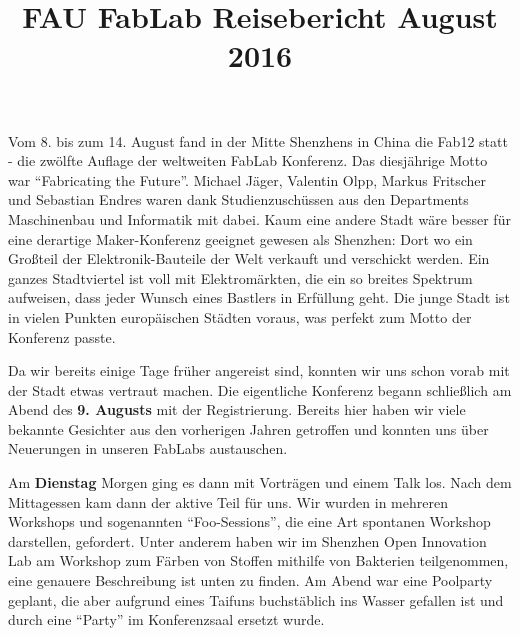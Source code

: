 \documentclass{\basedir/fablab-document}
\title{FAU FabLab Reisebericht August 2016}
\begin{document}
\begin{figure}[htb]
	\noindent{}
\end{figure}

\section*{}

Vom 8. bis zum 14. August fand in der Mitte Shenzhens in China die Fab12
statt - die zwölfte Auflage der weltweiten FabLab Konferenz. Das
diesjährige Motto war \enquote{Fabricating the Future}. Michael Jäger,
Valentin Olpp, Markus Fritscher und Sebastian Endres waren dank
Studienzuschüssen aus den Departments Maschinenbau und Informatik mit
dabei. Kaum eine andere Stadt wäre besser für eine derartige
Maker-Konferenz geeignet gewesen als Shenzhen: Dort wo ein Großteil der
Elektronik-Bauteile der Welt verkauft und verschickt werden. Ein ganzes
Stadtviertel ist voll mit Elektromärkten, die ein so breites Spektrum
aufweisen, dass jeder Wunsch eines Bastlers in Erfüllung geht. Die junge
Stadt ist in vielen Punkten europäischen Städten voraus, was perfekt
zum Motto der Konferenz passte.

Da wir bereits einige Tage früher angereist sind, konnten wir uns schon
vorab mit der Stadt etwas vertraut machen. Die eigentliche Konferenz
begann schließlich am Abend des \textbf{9. Augusts} mit der
Registrierung. Bereits hier haben wir viele bekannte Gesichter aus den
vorherigen Jahren getroffen und konnten uns über Neuerungen in unseren
FabLabs austauschen.

Am \textbf{Dienstag} Morgen ging es dann mit Vorträgen und einem Talk
los. Nach dem Mittagessen kam dann der aktive Teil für uns. Wir wurden
in mehreren Workshops und sogenannten \enquote{Foo-Sessions}, die eine Art
spontanen Workshop darstellen, gefordert. Unter anderem haben wir im
Shenzhen Open Innovation Lab am Workshop zum Färben von Stoffen mithilfe
von Bakterien teilgenommen, eine genauere Beschreibung ist unten zu
finden. Am Abend war eine Poolparty geplant, die aber aufgrund eines
Taifuns buchstäblich ins Wasser gefallen ist und durch eine \enquote{Party} im
Konferenzsaal ersetzt wurde.
\end{document}
